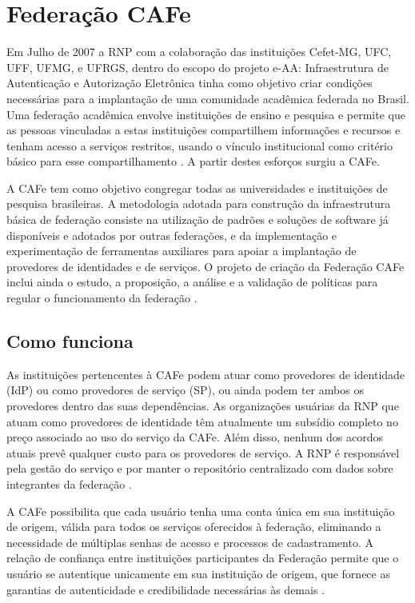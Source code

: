 \chapter{Federação CAFe}
\label{c_cap3}

Em Julho de 2007 a RNP com a colaboração das instituições Cefet-MG, UFC, UFF, UFMG, e UFRGS, dentro do escopo do projeto e-AA: Infraestrutura de Autenticação  e Autorização Eletrônica tinha como objetivo criar condições necessárias para a implantação de uma comunidade acadêmica federada no Brasil. Uma federação acadêmica envolve instituições de ensino e pesquisa e permite que as pessoas vinculadas a estas instituições compartilhem informações e recursos e tenham acesso a serviços restritos, usando o vínculo institucional como critério básico para esse compartilhamento \cite{moreira:11}. A partir destes esforços surgiu a \acf{CAFe}.

A CAFe tem como objetivo congregar todas as universidades e instituições de pesquisa brasileiras. A metodologia adotada para construção da infraestrutura básica de federação consiste na utilização de padrões e soluções de software já disponíveis e adotados por outras federações, e da implementação e experimentação de ferramentas auxiliares para apoiar a implantação de provedores de identidades e de serviços. O projeto de criação da Federação CAFe inclui ainda o estudo, a proposição, a análise e a validação de políticas para regular o funcionamento da federação \cite{moreira:11}.

\section{Como funciona}
\label{s_c3_funciona}

As instituições pertencentes à CAFe podem atuar como provedores de identidade (IdP) ou como provedores de serviço (SP), ou ainda podem ter ambos os provedores dentro das suas dependências. As organizações usuárias da RNP que atuam como provedores de identidade têm atualmente um subsídio completo no preço associado ao uso do serviço da CAFe. Além disso, nenhum dos acordos atuais prevê qualquer custo para os provedores de serviço. A RNP é responsável pela gestão do serviço e por manter o repositório centralizado com dados sobre integrantes da federação \cite{rnp:13}.

A CAFe possibilita que cada usuário tenha uma conta única em sua instituição de origem, válida para todos os serviços oferecidos à federação, eliminando a necessidade de múltiplas senhas de acesso e processos de cadastramento. A relação de confiança entre instituições participantes da Federação permite que o usuário se autentique unicamente em sua instituição de origem, que fornece as garantias de autenticidade e credibilidade necessárias às demais \cite{rnp:13}.

